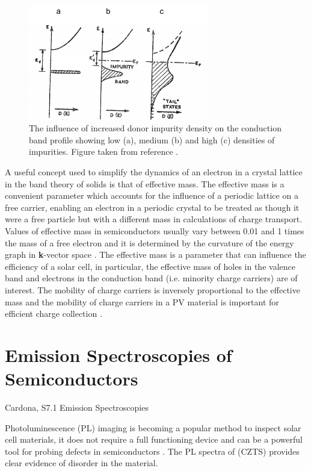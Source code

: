 \begin{figure}[h!]
  \centering
    \includegraphics[width=0.7\textwidth]{figures/bs2.png}
    \caption{The influence of increased donor impurity density on the conduction band profile showing low (a), medium (b) and high (c) densities of impurities. Figure taken from reference .}
  \label{bs2}
\end{figure}

A useful concept used to simplify the dynamics of an electron in a crystal lattice in the band theory of solids is that of effective mass. The effective mass is a convenient parameter which accounts for the influence of a periodic lattice on a free carrier, enabling an electron in a periodic crystal to be treated as though it were a free particle but with a different mass in calculations of charge transport. Values of effective mass in semiconductors usually vary between 0.01 and 1 times the mass of a free electron and it is determined by the curvature of the energy graph in \textbf{k}-vector space \cite{small_semiconductor2}. The effective mass is a parameter that can influence the efficiency of a solar cell, in particular, the effective mass of holes in the valence band and electrons in the conduction band (i.e. minority charge carriers) are of interest. The mobility of charge carriers is inversely proportional to the effective mass and the mobility of charge carriers in a PV material is important for efficient charge collection \cite{transport}.




\section{Emission Spectroscopies of Semiconductors}\label{PL_section}
Cardona, S7.1 Emission Spectroscopies

Photoluminescence (PL) imaging is becoming a popular method to inspect solar cell materials, it does not require a full functioning device and can be a powerful tool for probing defects in semiconductors \cite{characterization_book, Gerschon}. The PL spectra of \CZTS (CZTS) provides clear evidence of disorder in the material.

